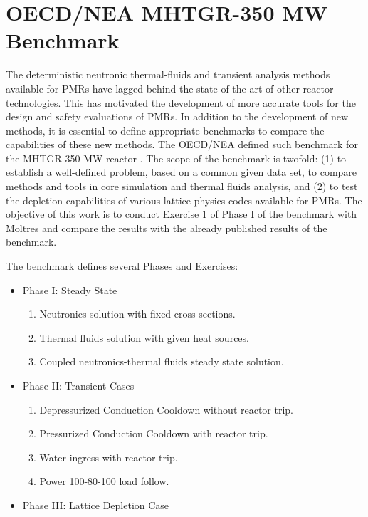 \documentclass[11pt,letterpaper]{article}
\begin{document}
\section{OECD/NEA MHTGR-350 MW Benchmark}

The deterministic neutronic thermal-fluids and transient analysis methods available for \glspl{PMR} have lagged behind the state of the art of other reactor technologies.
This has motivated the development of more accurate tools for the design and safety evaluations of \glspl{PMR}.
In addition to the development of new methods, it is essential to define appropriate benchmarks to compare the capabilities of these new methods.
The \gls{OECD}/\gls{NEA} defined such benchmark for the \gls{MHTGR}-350 MW reactor \cite{oecd_nea_benchmark_2017}.
The scope of the benchmark is twofold: (1) to establish a well-defined problem, based on a common given data set, to compare methods and tools in core simulation and thermal fluids analysis, and (2) to test the depletion capabilities of various lattice physics codes available for \glspl{PMR}.
The objective of this work is to conduct Exercise 1 of Phase I of the benchmark with Moltres and compare the results with the already published results of the benchmark\cite{oecd_nea_coupled_2019}.


The benchmark defines several Phases and Exercises:

\begin{itemize}
        \item Phase I: Steady State
        \begin{enumerate}
            \item Neutronics solution with fixed cross-sections. 
            \item Thermal fluids solution with given heat sources.
            \item Coupled neutronics-thermal fluids steady state solution.
        \end{enumerate}

        \item Phase II: Transient Cases
        \begin{enumerate}
            \item Depressurized Conduction Cooldown without reactor trip.
            \item Pressurized Conduction Cooldown with reactor trip.
            \item Water ingress with reactor trip.
            \item Power 100-80-100 load follow.
        \end{enumerate}

        \item Phase III: Lattice Depletion Case
\end{itemize}
\end{document}
